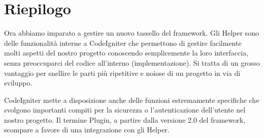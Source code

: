 \section{Riepilogo}
Ora abbiamo imparato a gestire un nuovo tassello del framework. Gli Helper sono delle funzionalità interne a CodeIgniter che permettono di gestire facilmente molti aspetti del nostro progetto conoscendo semplicemente la loro interfaccia, senza preoccuparci del codice all'interno (implementazione). Si tratta di un grosso vantaggio per snellire le parti più ripetitive e noiose di un progetto in via di sviluppo.

CodeIgniter mette a disposizione anche delle funzioni estremamente specifiche che svolgono importanti compiti per la sicurezza o l'autenticazione dell'utente nel nostro progetto. Il termine Plugin, a partire dalla versione 2.0 del framework, scompare a favore di una integrazione con gli Helper.